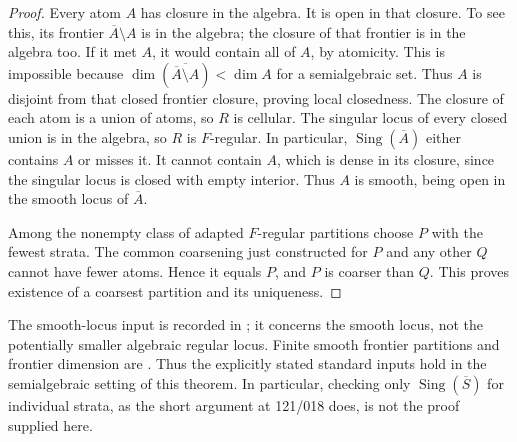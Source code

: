 \begin{proof}
Every atom $A$ has closure in the algebra. It is open in that closure.
To see this, its frontier $\overline A\setminus A$ is in the algebra;
the closure of that frontier is in the algebra too. If it met $A$, it
would contain all of $A$, by atomicity. This is impossible because
$\dim(\overline{\overline A\setminus A})<\dim A$ for a semialgebraic
set. Thus $A$ is disjoint from that closed frontier closure, proving
local closedness. The closure of each atom is a union of atoms, so $R$
is cellular. The singular locus of every closed union is in the algebra,
so $R$ is $F$-regular. In particular, $\operatorname{Sing}(\overline A)$
either contains $A$ or misses it. It cannot contain $A$, which is dense
in its closure, since the singular locus is closed with empty interior.
Thus $A$ is smooth, being open in the smooth locus of $\overline A$.

Among the nonempty class of adapted $F$-regular partitions choose $P$
with the fewest strata. The common coarsening just constructed for $P$
and any other $Q$ cannot have fewer atoms. Hence it equals $P$, and $P$
is coarser than $Q$. This proves existence of a coarsest partition and
its uniqueness.
\end{proof}

The smooth-locus input is recorded in \cite[\S2.A, pp.~635--636]{Fernando2018};
it concerns the smooth locus, not the potentially smaller algebraic regular
locus. Finite smooth frontier partitions and frontier dimension are
\cite[Theorems 1.3 and 1.5, the paragraph following Theorem 1.3,
and Proposition 1.9, pp.~3--5]{Coste2007}. Thus the explicitly stated
standard inputs hold in the semialgebraic setting of this theorem. In particular,
checking only $\operatorname{Sing}(\overline S)$ for individual strata,
as the short argument at 121/018 does, is not the proof supplied here.

